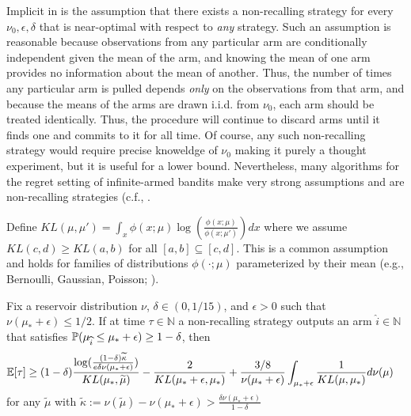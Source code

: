 Implicit in \cite{malloy2012quickest} is the assumption that there exists a non-recalling strategy for every $\nu_0, \epsilon, \delta$ that is near-optimal with respect to \emph{any} strategy.
Such an assumption is reasonable because observations from any particular arm are conditionally independent given the mean of the arm, and knowing the mean of one arm provides no information about the mean of another. 
Thus, the number of times any particular arm is pulled depends \emph{only} on the observations from that arm, and because the means of the arms are drawn i.i.d. from $\nu_0$, each arm should be treated identically.
Thus, the procedure will continue to discard arms until it finds one and commits to it for all time. 
Of course, any such non-recalling strategy would require precise knoweldge of $\nu_0$ making it purely a thought experiment, but it is useful for a lower bound.
Nevertheless, many algorithms for the regret setting of infinite-armed bandits make very strong assumptions and are non-recalling strategies (c.f., \cite{berry1997,bonald2013two,Chan2018Infinite}.

Define
$KL(\mu,\mu') = \int_{x} \phi(x;\mu) \log\left( \frac{\phi(x;\mu)}{\phi(x;\mu')}\right) dx$
where we assume $KL(c,d) \geq KL(a,b)$ for all $[a,b] \subseteq [c,d]$.
This is a common assumption and holds for families of distributions $\phi( \cdot ; \mu)$ parameterized by their mean (e.g., Bernoulli, Gaussian, Poisson; \cite{kaufmann2016complexity}).
\begin{theorem}\label{thm:fb-lb}
Fix a reservoir distribution $\nu$, $\delta \in (0,1/15)$, and $\epsilon >0$ such that $\nu(\mu_*+\epsilon) \leq 1/2$.
If at time $\tau \in \mathbb{N}$ a non-recalling strategy outputs an arm $\widehat{i} \in \mathbb{N}$ that satisfies $\P(\mu_{\widehat{i}} \leq \mu_* + \epsilon ) \geq 1-\delta$, then
\begin{align*}
\E[ \tau ] &\geq (1-\delta)\frac{  \log(\tfrac{(1-\delta)\widetilde{\kappa}}{e \delta \nu(\mu_*+\epsilon)})}{KL(\mu_* , \widetilde{\mu})}  - \frac{2}{KL(\mu_* + \epsilon, \mu_*)}  + \frac{3/8}{\nu(\mu_*+\epsilon)} \int_{\mu_*+\epsilon} \frac{1}{KL(\mu,\mu_*)} d\nu(\mu) 
\end{align*}
for any $\widetilde{\mu}$ with $\widetilde{\kappa} := \nu(\widetilde{\mu}) - \nu(\mu_*+\epsilon) > \frac{ \delta \nu(\mu_*+\epsilon)}{1-\delta}$
\end{theorem}


